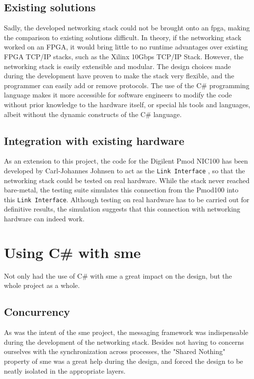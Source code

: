 \subsection{Existing solutions}
Sadly, the developed networking stack could not be brought onto an \gls{fpga},
making the comparison to existing solutions difficult.
In theory, if the networking stack worked on an FPGA, it would bring little to
no runtime advantages over existing FPGA TCP/IP stacks, such as the
Xilinx 10Gbps TCP/IP Stack\cite{sidler2016lowlatencytcp}.
However, the networking stack is easily extensible and modular. The design
choices made during the development have proven to make the stack very flexible,
and the programmer can easily add or remove protocols. The use of the C\#
programming language makes it more accessible for software engineers to modify
the code without prior knowledge to the hardware itself, or special \gls{hls}
tools and languages, albeit without the dynamic constructs of the C\# language.


\subsection{Integration with existing hardware}
As an extension to this project, the code for the Digilent Pmod NIC100\cite{pmod_nic100}
has been developed by Carl-Johannes Johnsen to act as the \texttt{Link Interface}
\cite{carl_pmod_nic100}, so that the networking stack could be tested on real
hardware.
While the stack never reached bare-metal, the testing suite simulates this
connection from the Pmod100 into this \texttt{Link Interface}. Although testing
on real hardware has to be carried out for definitive results, the simulation
suggests that this connection with networking hardware can indeed work.


\section{Using C\# with \gls{sme}}
Not only had the use of C\# with \gls{sme} a great impact on the design, but the
whole project as a whole.

\subsection{Concurrency}
As was the intent of the \gls{sme} project, the messaging framework was
indispensable during the development of the networking stack. Besides not
having to concerns ourselves with the synchronization across processes, the
"Shared Nothing" property of \gls{sme} was a great help during the design, and
forced the design to be neatly isolated in the appropriate layers.

